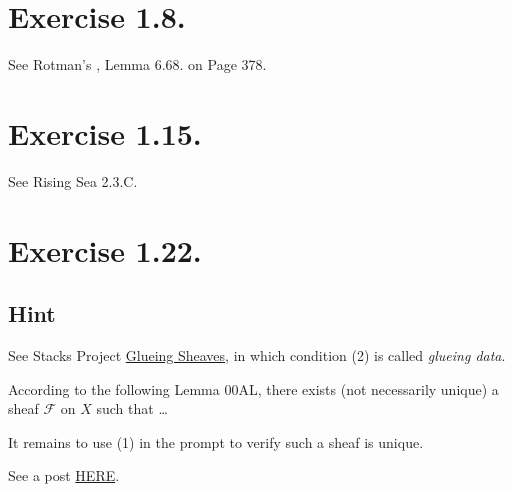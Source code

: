 \section{Exercise 1.8.}

See Rotman's \cite{rotman2009introduction}, Lemma 6.68. on Page 378.

\section{Exercise 1.15.}

See Rising Sea 2.3.C.

\section{Exercise 1.22.}

\subsection{Hint}
See Stacks Project \href{https://stacks.math.columbia.edu/tag/00AK}{Glueing Sheaves}, in which condition (2) is called \textit{glueing data}. 

According to the following Lemma 00AL, there exists (not necessarily unique) a sheaf $\mathscr F$ on $X$ such that \dots

It remains to use (1) in the prompt to verify such a sheaf is unique.

See a post \href{https://math.stackexchange.com/questions/455706/gluing-sheaves-can-we-realize-mathcalfw-as-some-kind-of-limit}{HERE}.